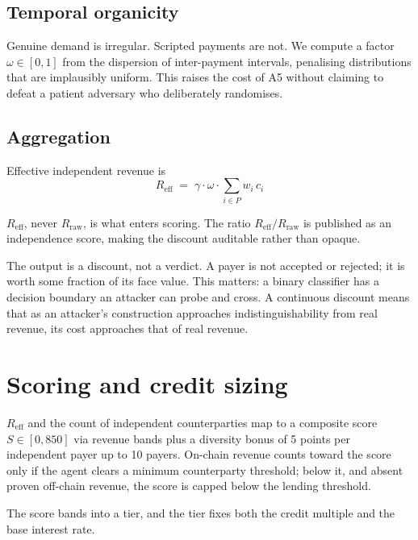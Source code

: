\documentclass[11pt,a4paper]{article}
\begin{document}
\subsection{Temporal organicity}

Genuine demand is irregular. Scripted payments are not. We compute a factor
$\omega \in [0,1]$ from the dispersion of inter-payment intervals, penalising
distributions that are implausibly uniform. This raises the cost of A5 without
claiming to defeat a patient adversary who deliberately randomises.

\subsection{Aggregation}

Effective independent revenue is
\begin{equation}
R_{\mathrm{eff}} \;=\; \gamma \cdot \omega \cdot \sum_{i \in P} w_i \, c_i
\label{eq:reff}
\end{equation}

$R_{\mathrm{eff}}$, never $R_{\mathrm{raw}}$, is what enters scoring. The ratio
$R_{\mathrm{eff}} / R_{\mathrm{raw}}$ is published as an independence score,
making the discount auditable rather than opaque.

The output is a discount, not a verdict. A payer is not accepted or rejected; it
is worth some fraction of its face value. This matters: a binary classifier has a
decision boundary an attacker can probe and cross. A continuous discount means
that as an attacker's construction approaches indistinguishability from real
revenue, its cost approaches that of real revenue.

\section{Scoring and credit sizing}
\label{sec:scoring}

$R_{\mathrm{eff}}$ and the count of independent counterparties map to a composite
score $S \in [0, 850]$ via revenue bands plus a diversity bonus of 5 points per
independent payer up to 10 payers. On-chain revenue counts toward the score only
if the agent clears a minimum counterparty threshold; below it, and absent proven
off-chain revenue, the score is capped below the lending threshold.

The score bands into a tier, and the tier fixes both the credit multiple and the
base interest rate.
\end{document}
